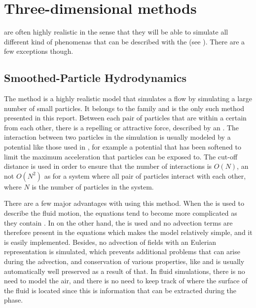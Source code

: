 \section{Three-dimensional methods}

 are often highly realistic in the sense that they will be able to simulate all different kind of phenomenas that can be described with the  (see ). There are a few exceptions though.

\subsection{Smoothed-Particle Hydrodynamics}
\label{sec:sph}

The \SPH method is a highly realistic model that simulates a flow by simulating a large number of small particles. It belongs to the family  and is the only such method presented in this report. Between each pair of particles that are within a certain  from each other, there is a repelling or attractive force, described by an \ODE. The interaction between two particles in the simulation is usually modeled by a potential like those used in \MD, for example a \LJ potential that has been softened to limit the maximum acceleration that particles can be exposed to. The cut-off distance is used in order to ensure that the number of interactions is $O(N)$, an not $O(N^2)$ as for a system where all pair of particles interact with each other, where $N$ is the number of particles in the system.

There are a few major advantages with using this method. When the  is used to describe the fluid motion, the equations tend to become more complicated as they contain . In \SPH on the other hand, the  is used and no advection terms are therefore present in the equations which makes the model relatively simple, and it is easily implemented. Besides, no advection of fields with an Eulerian representation is simulated, which prevents additional problems that can arise during the advection, and conservation of various properties, like \momentum and \energy is usually automatically well preserved as a result of that. In fluid simulations, there is no need to model the air, and there is no need to keep track of where the surface of the fluid is located since this is information that can be extracted during the  phase.

